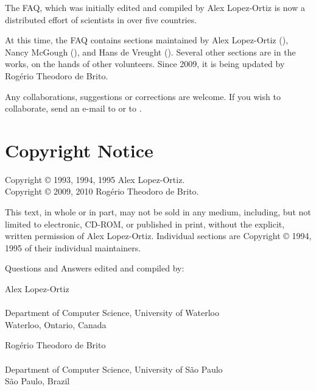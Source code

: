 The \scimath FAQ, which was initially edited and compiled by Alex
Lopez-Ortiz is now a distributed effort of scientists in over five
countries.

At this time, the FAQ contains sections maintained by Alex Lopez-Ortiz
(\emailalopez), Nancy McGough (\emailnancy), and Hans de Vreught
(\emailhans).  Several other sections are in the works, on the hands of
other volunteers. Since 2009, it is being updated by Rogério Theodoro de
Brito.

Any collaborations, suggestions or corrections are welcome. If you wish
to collaborate, send an e-mail to \emailrbrito or to \emailalopez.

\section{Copyright Notice}

\noindent
Copyright © 1993, 1994, 1995 Alex Lopez-Ortiz.\\
Copyright © 2009, 2010 Rogério Theodoro de Brito.

\bigskip

\noindent
This text, in whole or in part, may not be sold in any medium,
including, but not limited to electronic, CD-ROM, or published in print,
without the explicit, written permission of Alex Lopez-Ortiz.
Individual sections are Copyright © 1994, 1995 of their individual
maintainers.

\noindent Questions and Answers edited and compiled by:

\bigskip

\noindent
Alex Lopez-Ortiz\\
\emailalopez\\
Department of Computer Science, University of Waterloo\\
Waterloo, Ontario, Canada

\medskip

\noindent
Rogério Theodoro de Brito\\
\emailrbrito\\
Department of Computer Science, University of São Paulo\\
São Paulo, Brazil
